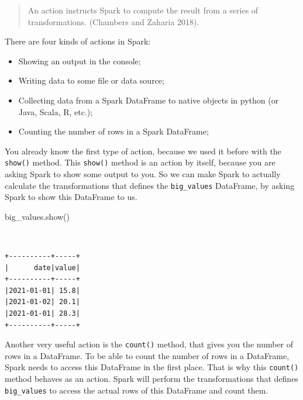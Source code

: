 \documentclass[
  11pt,
  letterpaper,
  DIV=11,
  numbers=noendperiod]{scrreprt}
\newenvironment{Shaded}{\begin{snugshade}}{\end{snugshade}}
\newcommand{\NormalTok}[1]{\textcolor[rgb]{0.00,0.23,0.31}{#1}}
\providecommand{\tightlist}{%
  \setlength{\itemsep}{0pt}\setlength{\parskip}{0pt}}\usepackage{longtable,booktabs,array}
\begin{document}
\begin{quote}
An action instructs Spark to compute the result from a series of
transformations. (Chambers and Zaharia 2018).
\end{quote}

There are four kinds of actions in Spark:

\begin{itemize}
\tightlist
\item
  Showing an output in the console;
\item
  Writing data to some file or data source;
\item
  Collecting data from a Spark DataFrame to native objects in python (or
  Java, Scala, R, etc.);
\item
  Counting the number of rows in a Spark DataFrame;
\end{itemize}

You already know the first type of action, because we used it before
with the \texttt{show()} method. This \texttt{show()} method is an
action by itself, because you are asking Spark to show some output to
you. So we can make Spark to actually calculate the transformations that
defines the \texttt{big\_values} DataFrame, by asking Spark to show this
DataFrame to us.

\begin{Shaded}
\begin{Highlighting}[]
\NormalTok{big\_values.show()}
\end{Highlighting}
\end{Shaded}


\begin{verbatim}
                                                                                
\end{verbatim}

\begin{verbatim}
+----------+-----+
|      date|value|
+----------+-----+
|2021-01-01| 15.8|
|2021-01-02| 20.1|
|2021-01-01| 28.3|
+----------+-----+
\end{verbatim}

Another very useful action is the \texttt{count()} method, that gives
you the number of rows in a DataFrame. To be able to count the number of
rows in a DataFrame, Spark needs to access this DataFrame in the first
place. That is why this \texttt{count()} method behaves as an action.
Spark will perform the transformations that defines \texttt{big\_values}
to access the actual rows of this DataFrame and count them.
\end{document}
